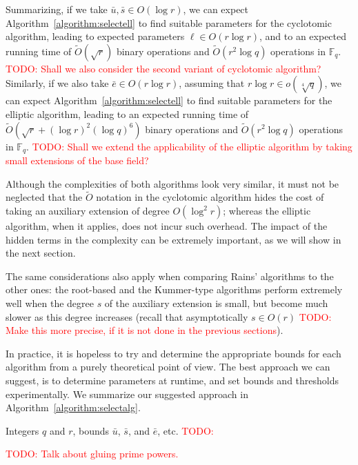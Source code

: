 \documentclass[12pt]{article}
\theoremstyle{plain}
\theoremstyle{definition}
\newcommand{\tildO}{\tilde{O}}
\newcommand{\todo}[1]{\textcolor{red}{TODO: #1}}
\def\F{\ensuremath{\mathbb{F}}}
\newcounter{algorithm}
\begin{document}
Summarizing, if we take $\bar{u},\bar{s}\in O(\log r)$, we can expect
Algorithm~\ref{algorithm:selectell} to find suitable parameters for
the cyclotomic algorithm, leading to expected parameters $\ell\in
O(r\log r)$, and to an expected running time of $\tildO(\sqrt{r})$
binary operations and $\tildO(r^2\log q)$ operations in
$\F_q$. \todo{Shall we also consider the second variant of cyclotomic
  algorithm?} Similarly, if we also take $\bar{e}\in O(r\log r)$,
assuming that $r\log r\in o(\sqrt[4]{q})$, we can expect
Algorithm~\ref{algorithm:selectell} to find suitable parameters for
the elliptic algorithm, leading to an expected running time of
$\tildO(\sqrt{r}+(\log r)^2(\log q)^6)$ binary operations and
$\tildO(r^2\log q)$ operations in $\F_q$. \todo{Shall we extend the
  applicability of the elliptic algorithm by taking small extensions
  of the base field?}

Although the complexities of both algorithms look very similar, it
must not be neglected that the $\tildO$ notation in the cyclotomic
algorithm hides the cost of taking an auxiliary extension of degree
$O(\log^2r)$; whereas the elliptic algorithm, when it applies, does
not incur such overhead. The impact of the hidden terms in the
complexity can be extremely important, as we will show in the next
section. 

The same considerations also apply when comparing Rains' algorithms to
the other ones: the root-based and the Kummer-type algorithms perform
extremely well when the degree $s$ of the auxiliary extension is
small, but become much slower as this degree increases (recall that
asymptotically $s\in O(r)$ \todo{Make this more precise, if it is not
  done in the previous sections}).

In practice, it is hopeless to try and determine the appropriate
bounds for each algorithm from a purely theoretical point of view. The
best approach we can suggest, is to determine parameters at runtime,
and set bounds and thresholds experimentally. We summarize our
suggested approach in Algorithm~\ref{algorithm:selectalg}. 

\begin{algorithm}
  \label{algorithm:selectalg}
  \begin{algorithmic}[1]
    \REQUIRE Integers $q$ and $r$, bounds $\bar{u}$, $\bar{s}$, and $\bar{e}$, etc.
    \STATE \todo{}
  \end{algorithmic}
\end{algorithm}

\todo{Talk about gluing prime powers.}
\end{document}
